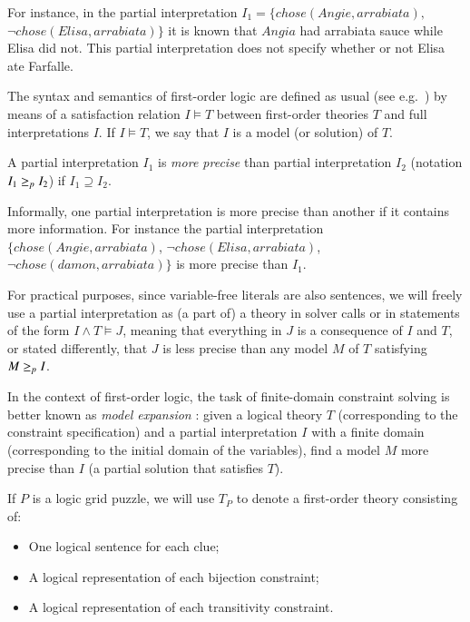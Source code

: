 For instance, in the partial interpretation $I_1=\{chose(Angie,arrabiata),$ $\lnot chose(Elisa,arrabiata)\}$ it is known that $Angia$ had arrabiata sauce while Elisa did not. This partial interpretation does not specify whether or not Elisa ate Farfalle.  


The syntax and semantics of first-order logic are defined as usual (see e.g.\ \cite{enderton}) by means of a satisfaction relation $I \models T$ between first-order theories $T$ and full interpretations $I$. If $I\models T$, we say that $I$ is a model (or solution) of $T$.


\begin{definition} %
	A partial interpretation $I_1$ is \emph{more precise} than partial interpretation $I_2$ (notation $I_1\geq_p I_2$) if $I_1\supseteq I_2$.
\end{definition}

Informally, one partial interpretation is more precise than another if it contains more information. For instance the partial interpretation $\{chose(Angie,arrabiata)$, $\lnot chose(Elisa,arrabiata)$, $ \lnot chose(damon,arrabiata)\}$ is more precise than $I_1$. 


For practical purposes, since variable-free literals are also sentences, we will freely use a partial interpretation as (a part of) a theory in solver calls or in statements of the form $I\land T \models J$, meaning that everything in $J$ is a consequence of $I$ and $T$, or stated differently, that $J$ is less precise than any model $M$ of $T$ satisfying $M\geq_p I$. 

In the context of first-order logic, the task of finite-domain constraint solving is better known as \emph{model expansion} \cite{MitchellTHM06}: given a logical theory $T$ (corresponding to the constraint specification) and a partial interpretation $I$ with a finite domain (corresponding to the initial domain of the variables), find a model $M$ more precise than $I$ (a partial solution that satisfies $T$).

If $P$ is a logic grid puzzle, we will use $T_P$ to denote a first-order theory consisting of:
\begin{itemize}
 \item One logical sentence for each clue;
 \item A logical representation of each bijection constraint;
 \item A logical representation of each transitivity constraint.
\end{itemize}

